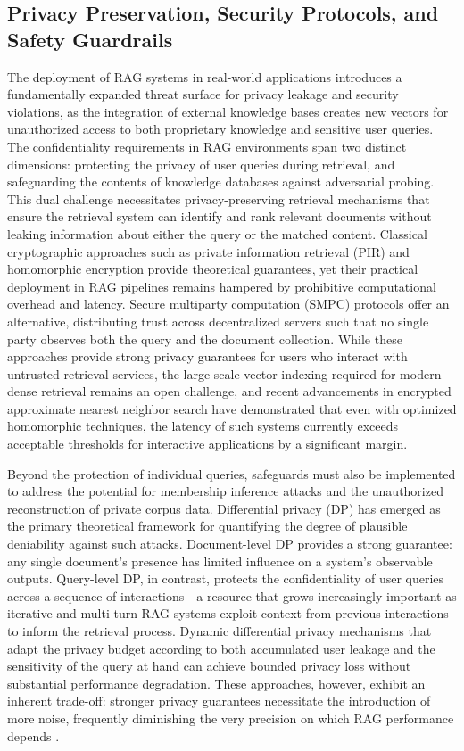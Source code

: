 \documentclass[11pt,a4paper]{article}
\begin{document}
\subsection{Privacy Preservation, Security Protocols, and Safety Guardrails}


The deployment of RAG systems in real-world applications introduces a fundamentally expanded threat surface for privacy leakage and security violations, as the integration of external knowledge bases creates new vectors for unauthorized access to both proprietary knowledge and sensitive user queries. The confidentiality requirements in RAG environments span two distinct dimensions: protecting the privacy of user queries during retrieval, and safeguarding the contents of knowledge databases against adversarial probing. This dual challenge necessitates privacy-preserving retrieval mechanisms that ensure the retrieval system can identify and rank relevant documents without leaking information about either the query or the matched content. Classical cryptographic approaches such as private information retrieval (PIR) and homomorphic encryption provide theoretical guarantees, yet their practical deployment in RAG pipelines remains hampered by prohibitive computational overhead and latency. Secure multiparty computation (SMPC) protocols offer an alternative, distributing trust across decentralized servers such that no single party observes both the query and the document collection. While these approaches provide strong privacy guarantees for users who interact with untrusted retrieval services, the large-scale vector indexing required for modern dense retrieval remains an open challenge, and recent advancements in encrypted approximate nearest neighbor search have demonstrated that even with optimized homomorphic techniques, the latency of such systems currently exceeds acceptable thresholds for interactive applications by a significant margin.

Beyond the protection of individual queries, safeguards must also be implemented to address the potential for membership inference attacks and the unauthorized reconstruction of private corpus data. Differential privacy (DP) has emerged as the primary theoretical framework for quantifying the degree of plausible deniability against such attacks. Document-level DP provides a strong guarantee: any single document's presence has limited influence on a system's observable outputs. Query-level DP, in contrast, protects the confidentiality of user queries across a sequence of interactions---a resource that grows increasingly important as iterative and multi-turn RAG systems exploit context from previous interactions to inform the retrieval process. Dynamic differential privacy mechanisms that adapt the privacy budget according to both accumulated user leakage and the sensitivity of the query at hand can achieve bounded privacy loss without substantial performance degradation. These approaches, however, exhibit an inherent trade-off: stronger privacy guarantees necessitate the introduction of more noise, frequently diminishing the very precision on which RAG performance depends \cite{arxiv:2503.08398v1,arxiv:2409.19019v1}.
\end{document}
